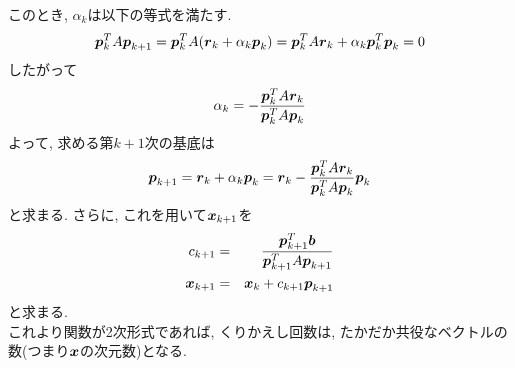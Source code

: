 \documentclass[dvipdfmx,a4j]{jsarticle}
\begin{document}
このとき, $\alpha_{k}$は以下の等式を満たす.
\begin{eqnarray*}
    \mbox{\boldmath $p$}_{k}^{T}A\mbox{\boldmath $p$}_{k+1}=\mbox{\boldmath $p$}_{k}^{T}A(\mbox{\boldmath $r$}_{k}+\alpha_{k}\mbox{\boldmath $p$}_{k})=\mbox{\boldmath $p$}_{k}^{T}A\mbox{\boldmath $r$}_{k}+\alpha_{k}\mbox{\boldmath $p$}_{k}^{T}\mbox{\boldmath $p$}_{k}=0
\end{eqnarray*}
したがって
\begin{eqnarray*}
    \alpha_{k}=-\frac{\mbox{\boldmath $p$}_{k}^{T}A\mbox{\boldmath $r$}_{k}}{\mbox{\boldmath $p$}_{k}^{T}A\mbox{\boldmath $p$}_{k}}
\end{eqnarray*}
よって, 求める第$k+1$次の基底は
\begin{eqnarray*}
    \mbox{\boldmath $p$}_{k+1}=\mbox{\boldmath $r$}_{k}+\alpha_{k}\mbox{\boldmath $p$}_{k}=\mbox{\boldmath $r$}_{k}-\frac{\mbox{\boldmath $p$}_{k}^{T}A\mbox{\boldmath $r$}_{k}}{\mbox{\boldmath $p$}_{k}^{T}A\mbox{\boldmath $p$}_{k}}\mbox{\boldmath $p$}_{k}
\end{eqnarray*}
と求まる. さらに, これを用いて$\mbox{\boldmath $x$}_{k+1}$を
\begin{eqnarray*}
    c_{k+1}&=&\frac{\mbox{\boldmath $p$}_{k+1}^{T}\mbox{\boldmath $b$}}{\mbox{\boldmath $p$}_{k+1}^{T}A\mbox{\boldmath $p$}_{k+1}}\\
    \mbox{\boldmath $x$}_{k+1}&=&\mbox{\boldmath $x$}_{k}+c_{k+1}\mbox{\boldmath $p$}_{k+1}
\end{eqnarray*}
と求まる.\\
これより関数が2次形式であれば, くりかえし回数は, たかだか共役なベクトルの数(つまり$\mbox{\boldmath $x$}$の次元数)となる.
\end{document}
